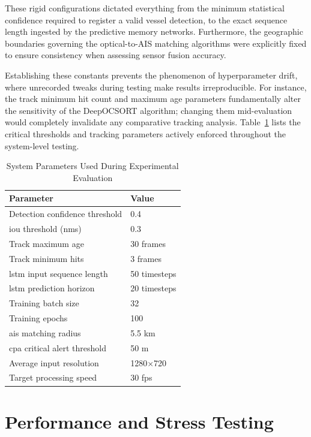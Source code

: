 These rigid configurations dictated everything from the minimum statistical confidence required to register a valid vessel detection, to the exact sequence length ingested by the predictive memory networks. Furthermore, the geographic boundaries governing the optical-to-AIS matching algorithms were explicitly fixed to ensure consistency when assessing sensor fusion accuracy. 

Establishing these constants prevents the phenomenon of hyperparameter drift, where unrecorded tweaks during testing make results irreproducible. For instance, the track minimum hit count and maximum age parameters fundamentally alter the sensitivity of the DeepOCSORT algorithm; changing them mid-evaluation would completely invalidate any comparative tracking analysis. Table~\ref{c5:tab:parameters} lists the critical thresholds and tracking parameters actively enforced throughout the system-level testing.

\begin{table}[H]
\centering
\caption{System Parameters Used During Experimental Evaluation}
\label{c5:tab:parameters}
\begin{tabular}{|p{}|p{}|}
\hline
\textbf{Parameter} & \textbf{Value}\\
\hline
Detection confidence threshold & 0.4\\
\hline
\gls{iou} threshold (\gls{nms}) & 0.3\\
\hline
Track maximum age & 30 frames\\
\hline
Track minimum hits & 3 frames\\
\hline
\gls{lstm} input sequence length & 50 timesteps\\
\hline
\gls{lstm} prediction horizon & 20 timesteps\\
\hline
Training batch size & 32\\
\hline
Training epochs & 100\\
\hline
\gls{ais} matching radius & 5.5 km\\
\hline
\gls{cpa} critical alert threshold & 50 m\\
\hline
Average input resolution & 1280$\times$720\\
\hline
Target processing speed & 30 \gls{fps}\\
\hline
\end{tabular}
\end{table}

\section{Performance and Stress Testing}

